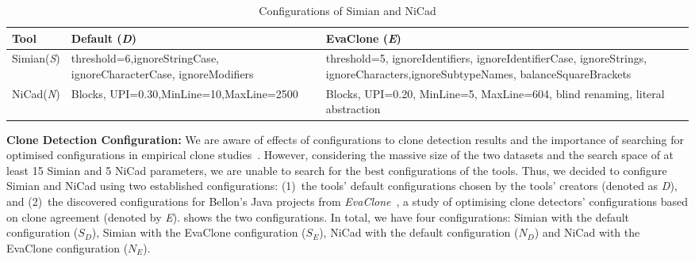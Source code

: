 \documentclass[sigconf,review, anonymous]{acmart}
\begin{document}
\begin{table}
  \centering
  \caption{Configurations of Simian and NiCad}
  \label{t:param_tuning}
  \small
  \begin{tabular}{p{0.7cm}|p{2.4cm}p{3.8cm}}
    \hline 
    Tool & Default (\textit{D}) & EvaClone (\textit{E}) \\
    \hline
    Simian\newline (\textit{S}) &  threshold=6,\newline ignoreStringCase, \newline ignoreCharacterCase, \newline ignoreModifiers & threshold=5, ignoreIdentifiers, \newline ignoreIdentifierCase, \newline ignoreStrings, ignoreCharacters,\newline ignoreSubtypeNames, \newline balanceSquareBrackets \\ 
    \hline 
    NiCad\newline (\textit{N}) & Blocks, UPI=0.30,\newline MinLine=10,\newline MaxLine=2500 & Blocks, UPI=0.20, \newline MinLine=5, MaxLine=604, \newline blind renaming, literal abstraction \\
    \hline
  \end{tabular} %
\end{table}

\textbf{Clone Detection Configuration: }
We are aware of effects of configurations to clone detection results
and the importance of searching for optimised configurations in
empirical clone
studies~\cite{Svajlenko2014,Wang2014,cr2016ssbse,Ragkhitwetsagul2016}. However,
considering the massive size of the two datasets and the search space
of at least 15 Simian and 5 NiCad parameters, we are unable to search
for the best configurations of the tools. Thus, we decided to
configure Simian and NiCad using two established configurations:
(1)~the tools' default configurations chosen by the tools' creators
(denoted as \textit{D}), and (2)~the discovered configurations for
Bellon's Java projects from \textit{EvaClone}~\cite{Wang2013}, a study
of optimising clone detectors' configurations based on clone agreement
(denoted by \textit{E}).  shows the two configurations.
In total, we have four configurations: Simian with the default
configuration ($S_D$), Simian with the EvaClone configuration ($S_E$), 
NiCad with the default configuration ($N_D$)
and NiCad with the EvaClone configuration ($N_E$).
\end{document}
